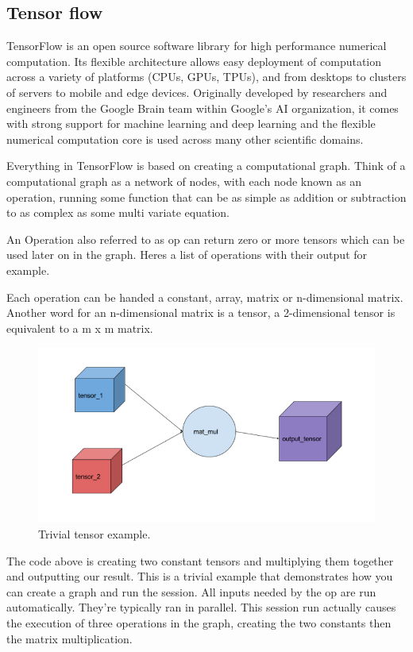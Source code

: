 \subsection{Tensor flow}

TensorFlow is an open source software library for high performance numerical computation. Its flexible architecture allows easy deployment of computation across a variety of platforms (CPUs, GPUs, TPUs), and from desktops to clusters of servers to mobile and edge devices. Originally developed by researchers and engineers from the Google Brain team within Google’s AI organization, it comes with strong support for machine learning and deep learning and the flexible numerical computation core is used across many other scientific domains.

Everything in TensorFlow is based on creating a computational graph. Think of a computational graph as a network of nodes, with each node known as an operation, running some function that can be as simple as addition or subtraction to as complex as some multi variate equation.

An Operation also referred to as op can return zero or more tensors which can be used later on in the graph. Heres a list of operations with their output for example.

Each operation can be handed a constant, array, matrix or n-dimensional matrix. Another word for an n-dimensional matrix is a tensor, a 2-dimensional tensor is equivalent to a m x m matrix.

\begin{figure}[H]
    \centering
    \includegraphics[width=6.5in]{images/tensor.png}
    \caption{Trivial tensor example.}
\end{figure}

The code above is creating two constant tensors and multiplying them together and outputting our result. This is a trivial example that demonstrates how you can create a graph and run the session. All inputs needed by the op are run automatically. They’re typically ran in parallel. This session run actually causes the execution of three operations in the graph, creating the two constants then the matrix multiplication.

